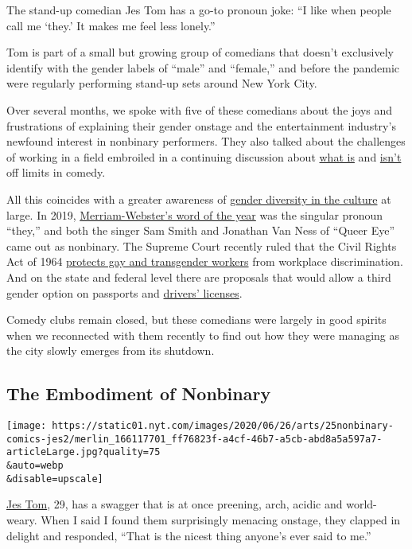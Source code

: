 The stand-up comedian Jes Tom has a go-to pronoun joke: ``I like when
people call me `they.' It makes me feel less lonely.''

Tom is part of a small but growing group of comedians that doesn't
exclusively identify with the gender labels of ``male'' and ``female,''
and before the pandemic were regularly performing stand-up sets around
New York City.

Over several months, we spoke with five of these comedians about the
joys and frustrations of explaining their gender onstage and the
entertainment industry's newfound interest in nonbinary performers. They
also talked about the challenges of working in a field embroiled in a
continuing discussion about \href{https://nyti.ms/31tBFrA}{what is} and
\href{https://nyti.ms/2V4Xy0p}{isn't} off limits in comedy.

All this coincides with a greater awareness of
\href{https://www.nytimes.com/2019/06/04/magazine/gender-nonbinary.html}{gender
diversity in the culture} at large. In 2019,
\href{https://www.nytimes.com/2019/12/10/us/merriam-webster-they-word-year.html}{Merriam-Webster's
word of the year} was the singular pronoun ``they,'' and both the singer
Sam Smith and Jonathan Van Ness of ``Queer Eye'' came out as nonbinary.
The Supreme Court recently ruled that the Civil Rights Act of 1964
\href{https://www.nytimes.com/2020/06/15/us/gay-transgender-workers-supreme-court.html}{protects
gay and transgender workers} from workplace discrimination. And on the
state and federal level there are proposals that would allow a third
gender option on passports and
\href{https://www.nytimes.com/2019/05/29/us/nonbinary-drivers-licenses.html}{drivers'
licenses}.

Comedy clubs remain closed, but these comedians were largely in good
spirits when we reconnected with them recently to find out how they were
managing as the city slowly emerges from its shutdown.

\hypertarget{the-embodiment-of-nonbinary}{%
\subsection{The Embodiment of
Nonbinary}\label{the-embodiment-of-nonbinary}}

\texttt{[image: https://static01.nyt.com/images/2020/06/26/arts/25nonbinary-comics-jes2/merlin\_166117701\_ff76823f-a4cf-46b7-a5cb-abd8a5a597a7-articleLarge.jpg?quality=75\\\&auto=webp\\\&disable=upscale]}

\href{https://www.jestomdotcom.com/}{Jes Tom}, 29, has a swagger that is
at once preening, arch, acidic and world-weary. When I said I found them
surprisingly menacing onstage, they clapped in delight and responded,
``That is the nicest thing anyone's ever said to me.''

